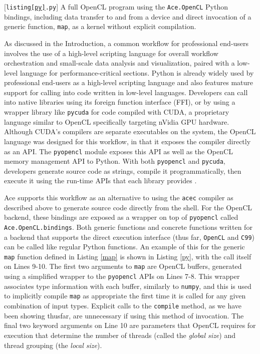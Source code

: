 \documentclass{sig-alternate}
\begin{document}
\begin{codelisting}

\caption{[\texttt{listing\ref{py}.py}] A full OpenCL program using the \texttt{Ace.OpenCL} Python bindings, including data transfer to and from a device and direct invocation of a generic function, \texttt{map}, as a kernel without explicit compilation.}
\label{py}
\end{codelisting}

As discussed in the Introduction, a common workflow for professional end-users involves the use of a high-level scripting language for overall workflow orchestration and small-scale data analysis and visualization, paired with a low-level language for performance-critical sections. Python is already widely used by professional end-users as a high-level scripting language and also features mature support for calling into code written in low-level languages. Developers can call into native libraries using its foreign function interface (FFI),  or by using a wrapper library like \verb|pycuda| for code compiled with CUDA, a proprietary language similar to OpenCL  specifically targeting nVidia GPU hardware. 
Although CUDA's compilers are separate executables on the system, the OpenCL language was designed for this workflow, in that it exposes the compiler directly as an API. The \verb|pyopencl| module exposes this API as well as the OpenCL memory management API to Python. With both \verb|pyopencl| and \verb|pycuda|, developers generate source code as strings, compile it programmatically, then execute it using the run-time APIs that each library provides \cite{pyopencl}.

Ace supports this workflow as an alternative to using the \verb|acec| compiler as described above to generate  source code directly from the shell. For the OpenCL backend, these bindings are exposed as a wrapper on top of \verb|pyopencl| called \verb|Ace.OpenCL.bindings|. Both generic functions and concrete functions written for a backend that supports the direct execution interface (thus far, \verb|OpenCL| and \verb|C99|) can be called like regular Python functions. An example of this for the generic \verb|map| function defined in Listing \ref{map} is shown in Listing \ref{py}, with the call itself on Lines 9-10. The first two arguments to \verb|map| are OpenCL buffers, generated using a simplified wrapper to the \verb|pyopencl| APIs on Lines 7-8. This wrapper associates type information with each buffer, similarly to \verb|numpy|, and this is used to implicitly compile \verb|map| as appropriate the first time it is called for any given combination of input types. Explicit calls to the \verb|compile| method, as we have been showing thusfar, are unnecessary if using this method of invocation. The final two keyword arguments on Line 10 are parameters that OpenCL requires for execution that determine the number of threads (called the {\em global size}) and thread grouping (the {\em local size}). 
\end{document}
